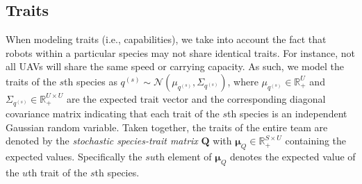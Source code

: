 \documentclass[letterpaper, 10 pt, conference]{ieeeconf}  %
\begin{document}
\subsection{Traits}
When modeling traits (i.e., capabilities), we take into account the fact that robots within a particular species may not share identical traits. For instance, not all UAVs will share the same speed or carrying capacity. As such, we model the traits of the $s$th species as $q^{(s)} \sim \mathcal{N}(\mu_{q^{(s)}}, \Sigma_{q^{(s)}})$, where $\mu_{q^{(s)}} \in \mathbb{R}_+^{U}$ and $\Sigma_{q^{(s)}} \in \mathbb{R}_+^{U \times U}$ are the expected trait vector and the corresponding diagonal covariance matrix indicating that each trait of the $s$th species is an independent Gaussian random variable. 
Taken together, the traits of the entire team are denoted by the \emph{stochastic species-trait matrix} $\bm{Q}$ with $\bm{\mu}_Q \in \mathbb{R}^{S \times U}_{+}$ containing the expected values. Specifically the $su$th element of $\bm{\mu}_Q$ denotes the expected value of the $u$th trait of the $s$th species.
\end{document}
